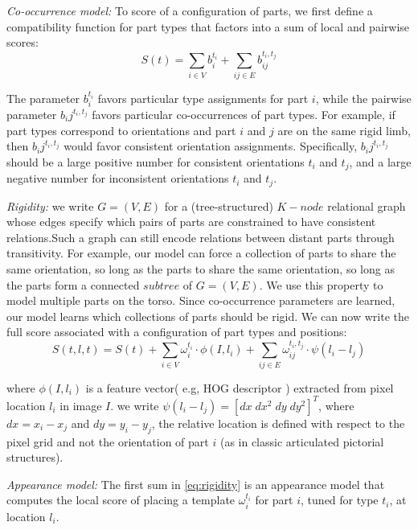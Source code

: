 \textit{Co-occurrence model:} To score of a configuration of parts, we first 
define a compatibility function for part types that factors into a sum of local and pairwise scores:
\begin{equation}
S(t)=\sum_{i\in V} b_i^{t_i} + \sum_{ij\in E} b_{ij}^{t_i,t_j}
\end{equation}

The parameter $b_i^{t_i}$ favors particular type assignments for part $i$, while
the pairwise parameter $b_ij^{t_i,t_j}$ favors particular co-occurrences of part types.
For example, if part types correspond to orientations and part $i$ and $j$ are on the
same rigid limb, then  $b_ij^{t_i,t_j}$ would favor consistent orientation assignments.
Specifically,  $b_ij^{t_i,t_j}$ should be a large positive number for consistent
orientations $t_i$ and $t_j$, and a large negative number for inconsistent orientations
$t_i$ and $t_j$.

\textit{Rigidity:} we write $G = (V,E)$ for a (tree-structured) $K-node$ relational
graph whose edges specify which pairs of parts are constrained to have consistent
relations.Such a graph can still encode relations between distant parts through transitivity.
For example, our model can force a collection of parts to share the same orientation,
so long as the parts to share the same orientation, so long as the parts form a connected
$subtree$ of $G = (V,E)$. We use this property to model multiple parts on the torso.
Since co-occurrence parameters are learned, our model learns which collections of parts should be rigid.
We can now write the full score associated with a configuration of part types and positions:
\begin{equation}
\label{eq:rigidity}
S(t,l,t)=S(t) + \sum_{i\in V} \omega_i^{t_i} \cdot \phi(I,l_i) + \sum_{ij\in E} \omega_{ij}^{t_i,t_j} \cdot \psi(l_i - l_j)
\end{equation}

where $\phi(I,l_i)$ is a feature vector( e.g, HOG descriptor \citet{Dalal2005})
extracted from pixel location $l_i$ in image $I$. we write $\psi(l_i - l_j)=[dx\; dx^2\; dy\; dy^2]^T$, 
where $dx=x_i - x_j$ and $dy=y_i - y_j$, the relative location is defined
with respect to the pixel grid and not the orientation of part $i$ (as in classic 
articulated pictorial structures).

\textit{Appearance model:} The first sum in \ref{eq:rigidity} is an appearance model 
that computes the local score of placing a template $\omega_i^{t_i}$ for part $i$,
tuned for type $t_i$, at location $l_i$.

